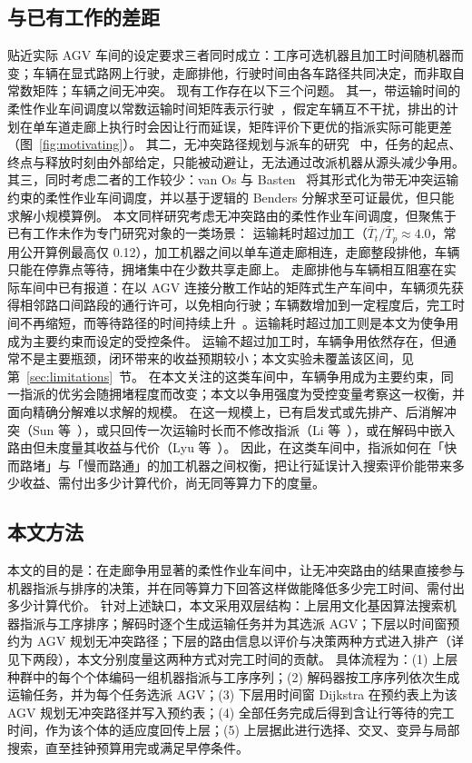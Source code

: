 \documentclass[manuscript,screen,review]{acmart}
\newcommand{\PubTtTpHi}{0.12}            %
\begin{document}
\subsection{与已有工作的差距}

贴近实际 AGV 车间的设定要求三者同时成立：工序可选机器且加工时间随机器而变；车辆在显式路网上行驶，走廊排他，行驶时间由各车路径共同决定，而非取自常数矩阵；车辆之间无冲突。
现有工作存在以下三个问题。
其一，带运输时间的柔性作业车间调度以常数运输时间矩阵表示行驶~\cite{xin2025review,meng2025cp,qin2026knowledge}，假定车辆互不干扰，排出的计划在单车道走廊上执行时会因让行而延误，矩阵评价下更优的指派实际可能更差（图~\ref{fig:motivating}）。
其二，无冲突路径规划与派车的研究~\cite{gao2023mapf,zhang2024guidance,kim2026congestion} 中，任务的起点、终点与释放时刻由外部给定，只能被动避让，无法通过改派机器从源头减少争用。
其三，同时考虑二者的工作较少：van Os 与 Basten~\cite{vanos2026exact} 将其形式化为带无冲突运输约束的柔性作业车间调度，并以基于逻辑的 Benders 分解求至可证最优，但只能求解小规模算例。
本文同样研究考虑无冲突路由的柔性作业车间调度，但聚焦于已有工作未作为专门研究对象的一类场景：
运输耗时超过加工（$\bar{T}_t/\bar{T}_p\approx4.0$，常用公开算例最高仅 \PubTtTpHi{}），加工机器之间以单车道走廊相连，走廊整段排他，车辆只能在停靠点等待，拥堵集中在少数共享走廊上。
走廊排他与车辆相互阻塞在实际车间中已有报道：在以 AGV 连接分散工作站的矩阵式生产车间中，车辆须先获得相邻路口间路段的通行许可，以免相向行驶；车辆数增加到一定程度后，完工时间不再缩短，而等待路径的时间持续上升~\cite{hardai2025matrix}。运输耗时超过加工则是本文为使争用成为主要约束而设定的受控条件。
运输不超过加工时，车辆争用依然存在，但通常不是主要瓶颈，闭环带来的收益预期较小；本文实验未覆盖该区间，见第~\ref{sec:limitations}~节。
在本文关注的这类车间中，车辆争用成为主要约束，同一指派的优劣会随拥堵程度而改变；本文以争用强度为受控变量考察这一权衡，并面向精确分解难以求解的规模。
在这一规模上，已有启发式或先排产、后消解冲突（Sun 等~\cite{sun2023integrated}），或只回传一次运输时长而不修改指派（Li 等~\cite{li2026framework}），或在解码中嵌入路由但未度量其收益与代价（Lyu 等~\cite{lyu2019approach}）。
因此，在这类车间中，指派如何在「快而路堵」与「慢而路通」的加工机器之间权衡，把让行延误计入搜索评价能带来多少收益、需付出多少计算代价，尚无同等算力下的度量。

\subsection{本文方法}

本文的目的是：在走廊争用显著的柔性作业车间中，让无冲突路由的结果直接参与机器指派与排序的决策，并在同等算力下回答这样做能降低多少完工时间、需付出多少计算代价。
针对上述缺口，本文采用双层结构：上层用文化基因算法搜索机器指派与工序排序；解码时逐个生成运输任务并为其选派 AGV；下层以时间窗预约为 AGV 规划无冲突路径；下层的路由信息以评价与决策两种方式进入排产（详见下两段），本文分别度量这两种方式对完工时间的贡献。
具体流程为：(1) 上层种群中的每个个体编码一组机器指派与工序序列；(2) 解码器按工序序列依次生成运输任务，并为每个任务选派 AGV；(3) 下层用时间窗 Dijkstra 在预约表上为该 AGV 规划无冲突路径并写入预约表；(4) 全部任务完成后得到含让行等待的完工时间，作为该个体的适应度回传上层；(5) 上层据此进行选择、交叉、变异与局部搜索，直至挂钟预算用完或满足早停条件。
\end{document}
